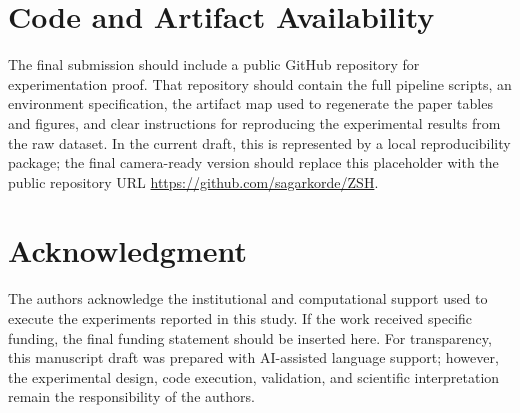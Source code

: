 \documentclass{ieeeaccess}
\begin{document}
\section*{Code and Artifact Availability}

The final submission should include a public GitHub repository for experimentation proof. That repository should contain the full pipeline scripts, an environment specification, the artifact map used to regenerate the paper tables and figures, and clear instructions for reproducing the experimental results from the raw dataset. In the current draft, this is represented by a local reproducibility package; the final camera-ready version should replace this placeholder with the public repository URL \url{https://github.com/sagarkorde/ZSH}.

\section*{Acknowledgment}

The authors acknowledge the institutional and computational support used to execute the experiments reported in this study. If the work received specific funding, the final funding statement should be inserted here. For transparency, this manuscript draft was prepared with AI-assisted language support; however, the experimental design, code execution, validation, and scientific interpretation remain the responsibility of the authors.
\end{document}
